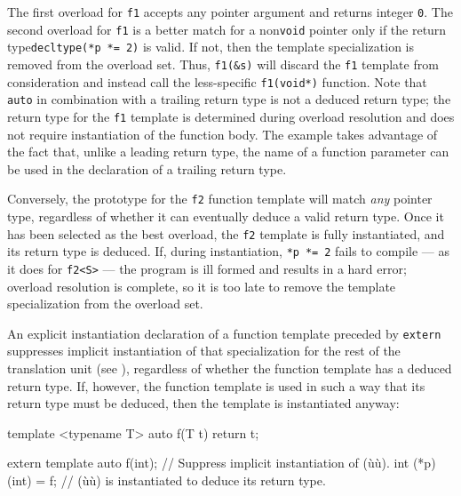 \noindent The first overload for \lstinline!f1! accepts any pointer argument and
returns integer \lstinline!0!. The second overload for \lstinline!f1! is a
better match for a non\lstinline!void! pointer only if the return type\linebreak[4]
\lstinline!decltype(*p!~\lstinline!*=!~\lstinline!2)! is valid. If not, then the
template specialization is removed from the overload set. Thus,
\lstinline!f1(&s)! will discard the \lstinline!f1! template from
consideration and instead call the less-specific \lstinline!f1(void*)!
function. Note that \lstinline!auto! in combination with a trailing return
type is not a deduced return type; the return type for the \lstinline!f1!
template is determined during overload resolution and does not require
instantiation of the function body. The example takes advantage of the
fact that, unlike a leading return type, the name of a function
parameter can be used in the declaration of a trailing return type.

Conversely, the prototype for the \lstinline!f2! function template will
match \emph{any} pointer type, regardless of whether it can eventually
deduce a valid return type. Once it has been selected as the best
overload, the \lstinline!f2! template is fully instantiated, and its return
type is deduced. If, during instantiation,
\lstinline!*p!~\lstinline!*=!~\lstinline!2! fails to compile --- as it does for
\lstinline!f2<S>! --- the program is ill formed and results in a hard
error; overload resolution is complete, so it is too late to remove the
template specialization from the overload set.

An explicit instantiation declaration of a function template preceded by
\lstinline!extern! suppresses implicit instantiation of that specialization
for the rest of the translation unit (see
), regardless of whether the function
template has a deduced return type. If, however, the function template
is used in such a way that its return type must be deduced, then the
template is instantiated anyway:

\begin{emcppslisting}
template <typename T> auto f(T t) { return t; }

extern template auto f(int);  // Suppress implicit instantiation of (ù{}ù).
int (*p)(int) = f;            // (ù{}ù) is instantiated to deduce its return type.
\end{emcppslisting}
    

